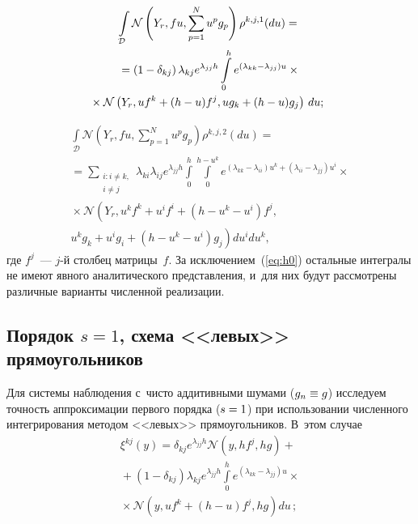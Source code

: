 \begin{multicols}{2}
 \vspace*{-12pt}
 
 \noindent
 \begin{multline}
 \int\limits_{\mathcal{D}}  \mathcal{N}\left(Y_{r},f u,\sum\limits_{p=1}^N 
 u^p g_p\right) \rho^{k,j,1}(du) ={} \\
 {}=\left(1-\delta_{kj}\right)\lambda_{kj}e^{\lambda_{jj}h}
 \int\limits_0^{h}
 e^{(\lambda_{kk}-\lambda_{jj})u}\times{}\\
 \hspace*{-3mm}{}\times
 \mathcal{N}\left(Y_{r},uf^k + (h - u)f^j, u g_k+(h-u)g_j\right)\,du;\!\!
 \label{eq:h1}
 \end{multline}
 
 \vspace*{-12pt}
 
 \noindent
\begin{multline}
\int\limits_{\mathcal{D}}  \!\!\mathcal{N}\left(Y_{r},f u,\sum\limits_{p=1}^N u^p g_p\right)
 \rho^{k,j,2}(du)  ={}\\
 {}=
  \sum\limits_{\substack{{i:i \neq k,}\\ {i \neq j}}} 
  \lambda_{k i}\lambda_{i j} 
  e^{\lambda_{jj}h}
\int\limits_0^{h} \!\int\limits_0^{h-u^k}
\!\!
e^{(\lambda_{kk}-\lambda_{i i})u^k+
\left(\lambda_{i i}-\lambda_{jj}\right)u^{i}}\times{} \\
{}\times
\mathcal{N}\left(Y_{r},u^kf^k+u^{i}f^{i}+(h -u^k-u^{i} )f^j,\right.\\
\left. u^kg_k+u^{i}g_{i}+(h -  u^k  - u^{i} )g_j
 \right) du^{i}du^{k},
 \label{eq:h2}
 \end{multline}
  где $f^j$~--- $j$-й столбец матрицы~$f$. За исключением~(\ref{eq:h0}) 
  остальные интегралы не имеют явного аналитического представления, и~для 
  них будут рассмотрены различные варианты численной реализации.

 \subsection{Порядок $s=1$, схема <<левых>> прямоугольников}
 
  Для системы наблюдения с~чисто аддитивными шумами ($g_n \hm\equiv g$) 
  исследуем точность аппроксимации первого порядка ($s\hm=1$) при 
  использовании численного интегрирования методом <<левых>> прямоугольников. 
  В~этом случае
 \begin{multline}
 \xi^{kj}(y)=\delta_{kj}e^{\lambda_{jj}h}\mathcal{N}(y,hf^j,hg)+ {}\\
 {}+
 (1-\delta_{kj})\lambda_{kj}e^{\lambda_{jj}h}
 \int\limits_0^h \!e^{(\lambda_{kk}-\lambda_{jj})u}\times{}\\
 {}\times
 \mathcal{N}\left(y,uf^k+(h-u)f^j,hg\right)du\,;
 \label{eq:xi_1}
 \end{multline}
 

\end{multicols}
